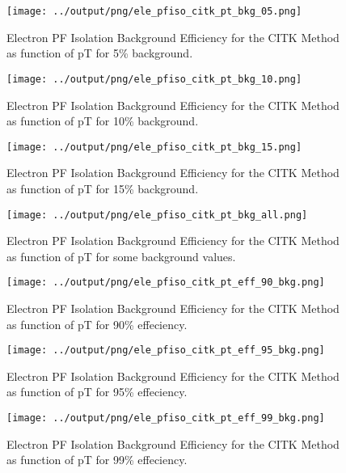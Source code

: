 \documentclass[11pt]{book}
\begin{document}
\begin{figure}[htb]
\centering
\texttt{[image: ../output/png/ele\_pfiso\_citk\_pt\_bkg\_05.png]}
\caption{Electron PF Isolation Background Efficiency for the CITK Method as function of pT for 5\% background.}
\label{fig:ele_pfiso_pt_bkg_citk_bkg_05}
\end{figure}

\begin{figure}[htb]
\centering
\texttt{[image: ../output/png/ele\_pfiso\_citk\_pt\_bkg\_10.png]}
\caption{Electron PF Isolation Background Efficiency for the CITK Method as function of pT for 10\% background.}
\label{fig:ele_pfiso_pt_bkg_citk_bkg_10}
\end{figure}

\begin{figure}[htb]
\centering
\texttt{[image: ../output/png/ele\_pfiso\_citk\_pt\_bkg\_15.png]}
\caption{Electron PF Isolation Background Efficiency for the CITK Method as function of pT for 15\% background.}
\label{fig:ele_pfiso_pt_bkg_citk_bkg_15}
\end{figure}

\begin{figure}[htb]
\centering
\texttt{[image: ../output/png/ele\_pfiso\_citk\_pt\_bkg\_all.png]}
\caption{Electron PF Isolation Background Efficiency for the CITK Method as function of pT for some background values.}
\label{fig:ele_pfiso_pt_bkg_citk_bkg_all}
\end{figure}

\begin{figure}[htb]
\centering
\texttt{[image: ../output/png/ele\_pfiso\_citk\_pt\_eff\_90\_bkg.png]}
\caption{Electron PF Isolation Background Efficiency for the CITK Method as function of pT for 90\% effeciency.}
\label{fig:ele_pfiso_pt_eff_citk_eff_90_bkg}
\end{figure}

\begin{figure}[htb]
\centering
\texttt{[image: ../output/png/ele\_pfiso\_citk\_pt\_eff\_95\_bkg.png]}
\caption{Electron PF Isolation Background Efficiency for the CITK Method as function of pT for 95\% effeciency.}
\label{fig:ele_pfiso_pt_eff_citk_eff_95_bkg}
\end{figure}

\begin{figure}[htb]
\centering
\texttt{[image: ../output/png/ele\_pfiso\_citk\_pt\_eff\_99\_bkg.png]}
\caption{Electron PF Isolation Background Efficiency for the CITK Method as function of pT for 99\% effeciency.}
\label{fig:ele_pfiso_pt_eff_citk_eff_99_bkg}
\end{figure}
\end{document}
